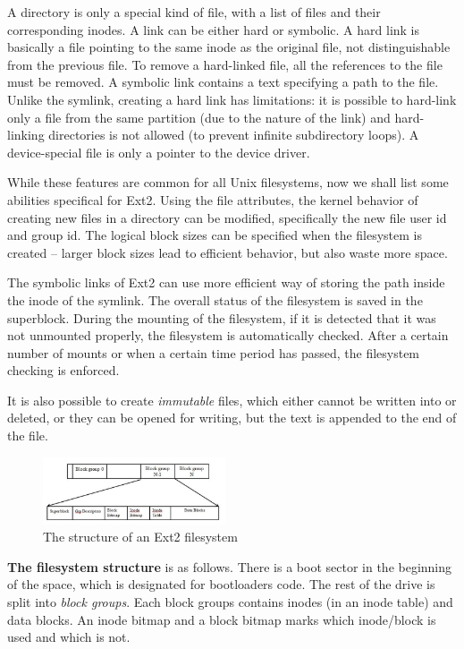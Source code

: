 \documentclass{acm_proc_article-sp}
\begin{document}
A directory is only a special kind of file, with a list of files and their corresponding inodes. A link can be either hard or symbolic. A hard link is basically a file pointing to the same inode as the original file, not distinguishable from the previous file. To remove a hard-linked file, all the references to the file must be removed. A symbolic link contains a text specifying a path to the file. Unlike the symlink, creating a hard link has limitations: it is possible to hard-link only a file from the same partition (due to the nature of the link) and hard-linking directories is not allowed (to prevent infinite subdirectory loops). A device-special file is only a pointer to the device driver.

While these features are common for all Unix filesystems, now we shall list some abilities specifical for Ext2. Using the file attributes, the kernel behavior of creating new files in a directory can be modified, specifically the new file user id and group id. The logical block sizes can be specified when the filesystem is created -- larger block sizes lead to efficient behavior, but also waste more space.

The symbolic links of Ext2 can use more efficient way of storing the path inside the inode of the symlink. The overall status of the filesystem is saved in the superblock. During the mounting of the filesystem, if it is detected that it was not unmounted properly, the filesystem is automatically checked. After a certain number of mounts or when a certain time period has passed, the filesystem checking is enforced.

It is also possible to create {\it immutable} files, which either cannot be written into or deleted, or they can be opened for writing, but the text is appended to the end of the file.

\begin{figure}
\centering
\includegraphics[width=0.48\textwidth]{images/ext2structure.jpg}
	\caption{The structure of an Ext2 filesystem \cite{ext2structure}}
\end{figure}

{\bf The filesystem structure} is as follows. There is a boot sector in the beginning of the space, which is designated for bootloaders code. The rest of the drive is split into {\it block groups}. Each block groups contains inodes (in an inode table) and data blocks. An inode bitmap and a block bitmap marks which inode/block is used and which is not. 
\end{document}
